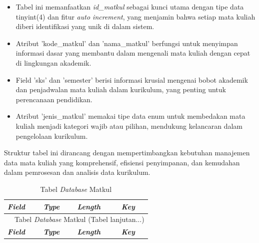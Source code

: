 \begin{enumerate}
	      \begin{itemize}
		      \item Tabel ini memanfaatkan \textit{id\_matkul} sebagai kunci utama dengan tipe data tinyint(4) dan fitur \textit{auto increment}, yang menjamin bahwa setiap mata kuliah diberi identifikasi yang unik di dalam sistem.
		      \item Atribut 'kode\_matkul' dan 'nama\_matkul' berfungsi untuk menyimpan informasi dasar yang membantu dalam mengenali mata kuliah dengan cepat di lingkungan akademik.
		      \item Field 'sks' dan 'semester' berisi informasi krusial mengenai bobot akademik dan penjadwalan mata kuliah dalam kurikulum, yang penting untuk perencanaan pendidikan.
		      \item Atribut 'jenis\_matkul' memakai tipe data enum untuk membedakan mata kuliah menjadi kategori wajib atau pilihan, mendukung kelancaran dalam pengelolaan kurikulum.
	      \end{itemize}

	      Struktur tabel ini dirancang dengan mempertimbangkan kebutuhan manajemen data mata kuliah yang komprehensif, efisiensi penyimpanan, dan kemudahan dalam pemrosesan dan analisis data kurikulum.

		      {
			      \fontsize{10}{12}\selectfont
			      \begin{longtable}{l l l l}
				      \caption{Tabel \textit{\textit{Database}} Matkul}
				      \label{admin}                                                                                                   \\
				      \hline
				      \textbf{\textit{Field}} & \textbf{\textit{Type}} & \textbf{\textit{Length}} & \textbf{\textit{Key}}             \\
				      \hline
				      \endfirsthead

				      \multicolumn{4}{c}{\tablename\ \thetable\ {Tabel \textit{\textit{Database}} Matkul} \space (Tabel lanjutan...)} \\
				      \hline
				      \textbf{\textit{Field}} & \textbf{\textit{Type}} & \textbf{\textit{Length}} & \textbf{\textit{Key}}             \\
				      \hline
				      \endhead


\end{longtable}}
\end{enumerate}
